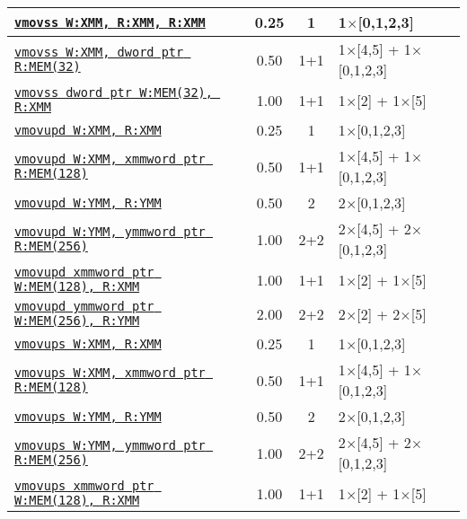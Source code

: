 \documentclass[a4paper,english,fontsize=9]{scrartcl}
\begin{document}
\begin{longtable}{p{}ccL{.25\textwidth}}
  \midrule
  \texttt{\href{https://felixcloutier.com/x86/MOVSS.html}{vmovss W:XMM, R:XMM, R:XMM}} & 0.25 & 1 & 1\(\times\)[0,1,2,3] \\
  \midrule
  \texttt{\href{https://felixcloutier.com/x86/MOVSS.html}{vmovss W:XMM, dword ptr R:MEM(32)}} & 0.50 & 1+1 & 1\(\times\)[4,5] + 1\(\times\)[0,1,2,3] \\
  \midrule
  \texttt{\href{https://felixcloutier.com/x86/MOVSS.html}{vmovss dword ptr W:MEM(32), R:XMM}} & 1.00 & 1+1 & 1\(\times\)[2] + 1\(\times\)[5] \\
  \midrule
  \texttt{\href{https://felixcloutier.com/x86/MOVUPD.html}{vmovupd W:XMM, R:XMM}} & 0.25 & 1 & 1\(\times\)[0,1,2,3] \\
  \midrule
  \texttt{\href{https://felixcloutier.com/x86/MOVUPD.html}{vmovupd W:XMM, xmmword ptr R:MEM(128)}} & 0.50 & 1+1 & 1\(\times\)[4,5] + 1\(\times\)[0,1,2,3] \\
  \midrule
  \texttt{\href{https://felixcloutier.com/x86/MOVUPD.html}{vmovupd W:YMM, R:YMM}} & 0.50 & 2 & 2\(\times\)[0,1,2,3] \\
  \midrule
  \texttt{\href{https://felixcloutier.com/x86/MOVUPD.html}{vmovupd W:YMM, ymmword ptr R:MEM(256)}} & 1.00 & 2+2 & 2\(\times\)[4,5] + 2\(\times\)[0,1,2,3] \\
  \midrule
  \texttt{\href{https://felixcloutier.com/x86/MOVUPD.html}{vmovupd xmmword ptr W:MEM(128), R:XMM}} & 1.00 & 1+1 & 1\(\times\)[2] + 1\(\times\)[5] \\
  \midrule
  \texttt{\href{https://felixcloutier.com/x86/MOVUPD.html}{vmovupd ymmword ptr W:MEM(256), R:YMM}} & 2.00 & 2+2 & 2\(\times\)[2] + 2\(\times\)[5] \\
  \midrule
  \texttt{\href{https://felixcloutier.com/x86/MOVUPS.html}{vmovups W:XMM, R:XMM}} & 0.25 & 1 & 1\(\times\)[0,1,2,3] \\
  \midrule
  \texttt{\href{https://felixcloutier.com/x86/MOVUPS.html}{vmovups W:XMM, xmmword ptr R:MEM(128)}} & 0.50 & 1+1 & 1\(\times\)[4,5] + 1\(\times\)[0,1,2,3] \\
  \midrule
  \texttt{\href{https://felixcloutier.com/x86/MOVUPS.html}{vmovups W:YMM, R:YMM}} & 0.50 & 2 & 2\(\times\)[0,1,2,3] \\
  \midrule
  \texttt{\href{https://felixcloutier.com/x86/MOVUPS.html}{vmovups W:YMM, ymmword ptr R:MEM(256)}} & 1.00 & 2+2 & 2\(\times\)[4,5] + 2\(\times\)[0,1,2,3] \\
  \midrule
  \texttt{\href{https://felixcloutier.com/x86/MOVUPS.html}{vmovups xmmword ptr W:MEM(128), R:XMM}} & 1.00 & 1+1 & 1\(\times\)[2] + 1\(\times\)[5] \\

\end{longtable}
\end{document}
